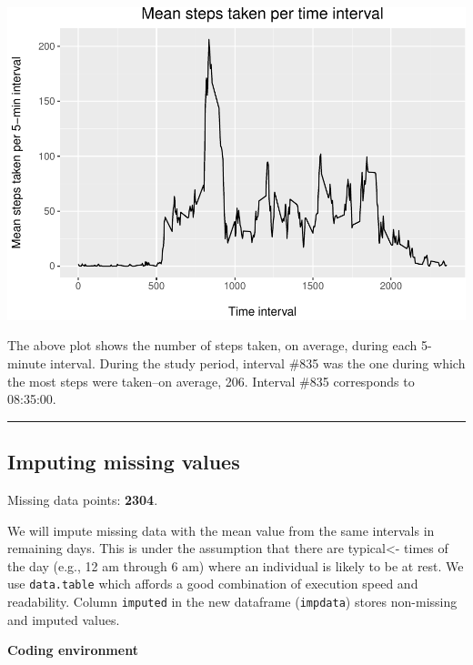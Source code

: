 \documentclass[
  paper=a4,
  ,captions=tableheading
]{scrartcl}
\newenvironment{Shaded}{\begin{snugshade}}{\end{snugshade}}
\newcommand{\CommentTok}[1]{\textcolor[rgb]{0.56,0.35,0.01}{\textit{#1}}}
\newcommand{\FunctionTok}[1]{\textcolor[rgb]{0.00,0.00,0.00}{#1}}
\newcommand{\NormalTok}[1]{#1}
\newcommand{\OtherTok}[1]{\textcolor[rgb]{0.56,0.35,0.01}{#1}}
\newcommand{\SpecialCharTok}[1]{\textcolor[rgb]{0.00,0.00,0.00}{#1}}
\begin{document}
\begin{center}\includegraphics[width=0.6\linewidth]{PA1_template_files/figure-latex/time-series-1} \end{center}

\begin{Shaded}
\end{Shaded}

The above plot shows the number of steps taken, on average, during each
5-minute interval. During the study period, interval \#835 was the one
during which the most steps were taken--on average, 206. Interval \#835
corresponds to 08:35:00.

\begin{center}\rule{0.5\linewidth}{0.5pt}\end{center}

\hypertarget{imputing-missing-values}{%
\subsection{Imputing missing values}\label{imputing-missing-values}}

Missing data points: \textbf{2304}.

We will impute missing data with the mean value from the same intervals
in remaining days. This is under the assumption that there are
typical\textless- times of the day (e.g., 12 am through 6 am) where an
individual is likely to be at rest. We use \texttt{data.table} which
affords a good combination of execution speed and readability. Column
\texttt{imputed} in the new dataframe (\texttt{impdata}) stores
non-missing and imputed values.

\textbf{Coding environment}
\end{document}
